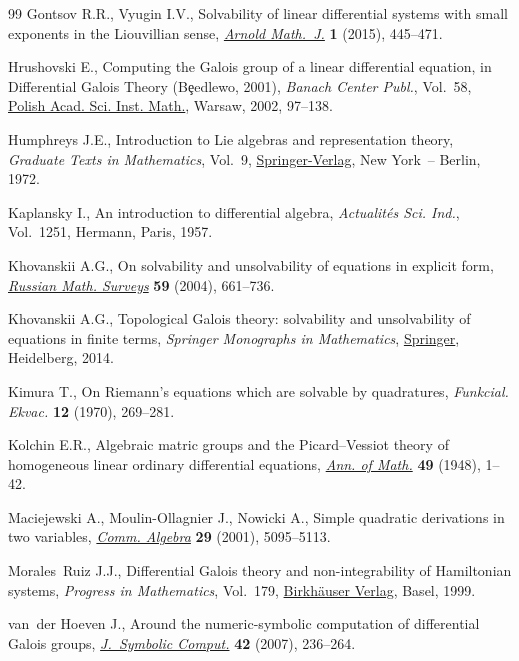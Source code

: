 \documentclass[pdftex]{sigma}
\numberwithin{equation}{section}
\begin{document}
\begin{thebibliography}{99}
Gontsov R.R., Vyugin I.V., Solvability of linear differential systems with
 small exponents in the {L}iouvillian sense, \href{https://doi.org/10.1007/s40598-015-0032-4}{\textit{Arnold Math.~J.}}
 \textbf{1} (2015), 445--471.

Hrushovski E., Computing the {G}alois group of a linear differential equation,
 in Differential {G}alois Theory ({B}\c{e}edlewo, 2001), \textit{Banach Center
 Publ.}, Vol.~58, \href{https://doi.org/10.4064/bc58-0-9}{Polish Acad. Sci. Inst. Math.}, Warsaw, 2002, 97--138.

Humphreys J.E., Introduction to {L}ie algebras and representation theory,
 \textit{Graduate Texts in Mathematics}, Vol.~9, \href{https://doi.org/10.1007/978-1-4612-6398-2}{Springer-Verlag}, New York~--
 Berlin, 1972.

Kaplansky I., An introduction to differential algebra, \textit{Actualit\'{e}s
 Sci. Ind.}, Vol.~1251, Hermann, Paris, 1957.

Khovanskii A.G., On solvability and unsolvability of equations in explicit
 form, \href{https://doi.org/10.1070/RM2004v059n04ABEH000759}{\textit{Russian Math. Surveys}} \textbf{59} (2004), 661--736.

Khovanskii A.G., Topological {G}alois theory: solvability and unsolvability of
 equations in finite terms, \textit{Springer Monographs in Mathematics}, \href{https://doi.org/10.1007/978-3-642-38871-2}{Springer},
 Heidelberg, 2014.

Kimura T., On {R}iemann's equations which are solvable by quadratures,
 \textit{Funkcial. Ekvac.} \textbf{12} (1970), 269--281.

Kolchin E.R., Algebraic matric groups and the {P}icard--{V}essiot theory of
 homogeneous linear ordinary differential equations, \href{https://doi.org/10.2307/1969111}{\textit{Ann. of Math.}}
 \textbf{49} (1948), 1--42.

Maciejewski A., Moulin-Ollagnier J., Nowicki A., Simple quadratic derivations
 in two variables, \href{https://doi.org/10.1081/AGB-100106804}{\textit{Comm. Algebra}} \textbf{29} (2001), 5095--5113.

Morales~Ruiz J.J., Differential {G}alois theory and non-integrability of
 {H}amiltonian systems, \textit{Progress in Mathematics}, Vol.~179,
 \href{https://doi.org/10.1007/978-3-0348-8718-2}{Birkh\"{a}user Verlag}, Basel, 1999.

van~der Hoeven J., Around the numeric-symbolic computation of differential
 {G}alois groups, \href{https://doi.org/10.1016/j.jsc.2006.03.007}{\textit{J.~Symbolic Comput.}} \textbf{42} (2007), 236--264.


\end{thebibliography}
\end{document}

